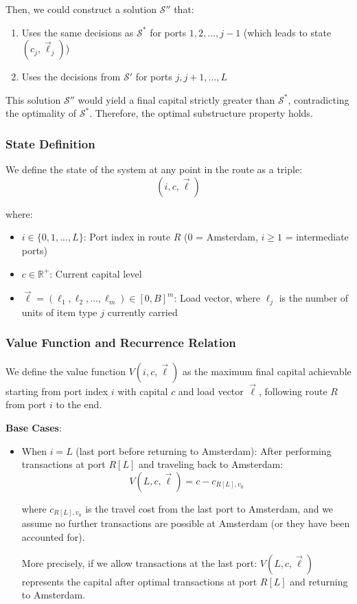 \documentclass[12pt]{article}
\begin{document}
Then, we could construct a solution $\mathcal{S}''$ that:
\begin{enumerate}
    \item Uses the same decisions as $\mathcal{S}^*$ for ports $1, 2, ..., j-1$ (which leads to state $(c_j, \vec{\ell}_j)$)
    \item Uses the decisions from $\mathcal{S}'$ for ports $j, j+1, ..., L$
\end{enumerate}

This solution $\mathcal{S}''$ would yield a final capital strictly greater than $\mathcal{S}^*$, contradicting the optimality of $\mathcal{S}^*$. Therefore, the optimal substructure property holds.

\subsubsection{State Definition}

We define the state of the system at any point in the route as a triple:
$$(i, c, \vec{\ell})$$

where:
\begin{itemize}
    \item $i \in \{0, 1, ..., L\}$: Port index in route $R$ (0 = Amsterdam, $i \geq 1$ = intermediate ports)
    \item $c \in \mathbb{R}^+$: Current capital level
    \item $\vec{\ell} = (\ell_1, \ell_2, ..., \ell_m) \in [0, B]^m$: Load vector, where $\ell_j$ is the number of units of item type $j$ currently carried
\end{itemize}

\subsubsection{Value Function and Recurrence Relation}

We define the value function $V(i, c, \vec{\ell})$ as the maximum final capital achievable starting from port index $i$ with capital $c$ and load vector $\vec{\ell}$, following route $R$ from port $i$ to the end.

\textbf{Base Cases}:
\begin{itemize}
    \item When $i = L$ (last port before returning to Amsterdam): After performing transactions at port $R[L]$ and traveling back to Amsterdam:
    $$V(L, c, \vec{\ell}) = c - c_{R[L], v_0}$$
    
    where $c_{R[L], v_0}$ is the travel cost from the last port to Amsterdam, and we assume no further transactions are possible at Amsterdam (or they have been accounted for).
    
    More precisely, if we allow transactions at the last port: $V(L, c, \vec{\ell})$ represents the capital after optimal transactions at port $R[L]$ and returning to Amsterdam.
\end{itemize}
\end{document}
